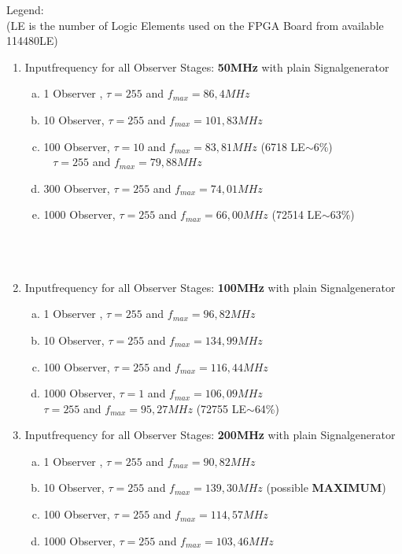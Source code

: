 Legend:\\
(LE is the number of Logic Elements used on the FPGA Board from available 114480LE)
\begin{enumerate}[(1)]
\item Inputfrequency for all Observer Stages: \textbf{50MHz}
 with plain Signalgenerator
  \begin{enumerate}[a)]
    \item 1 Observer , $\tau = 255$ and $f_{max} = 86,4MHz$
    \item 10 Observer, $\tau = 255$ and $f_{max} = 101,83MHz$
    \item 100 Observer, $\tau = 10$ and $f_{max} = 83,81MHz$  (6718 LE$\sim$6\%)\\
      $\;\;\;\tau = 255$ and $f_{max} = 79,88MHz$
    \item 300 Observer, $\tau = 255$ and $f_{max} = 74,01MHz$ 
    \item 1000 Observer, $\tau = 255$ and $f_{max} = 66,00MHz$ (72514 LE$\sim$63\%)\\\\\\\\
  \end{enumerate}


\item Inputfrequency for all Observer Stages: \textbf{100MHz}
 with plain Signalgenerator
  \begin{enumerate}[a)]
    \item 1 Observer , $\tau = 255$ and $f_{max} = 96,82MHz$
    \item 10 Observer, $\tau = 255$ and $f_{max} = 134,99MHz$
    \item 100 Observer, $\tau = 255$ and $f_{max} = 116,44MHz$
    \item 1000 Observer, $\tau = 1$ and $f_{max} = 106,09MHz$ \\
    $\tau = 255$ and $f_{max} = 95,27MHz$ (72755 LE$\sim$64\%)
  \end{enumerate}


\item Inputfrequency for all Observer Stages: \textbf{200MHz}
 with plain Signalgenerator
  \begin{enumerate}[a)]
    \item 1 Observer , $\tau = 255$ and $f_{max} = 90,82MHz$
    \item 10 Observer, $\tau = 255$ and $f_{max} = 139,30MHz$ (possible \textbf{MAXIMUM})
    \item 100 Observer, $\tau = 255$ and $f_{max} = 114,57MHz$
    \item 1000 Observer, $\tau = 255$ and $f_{max} = 103,46MHz$
  \end{enumerate}
\end{enumerate}

